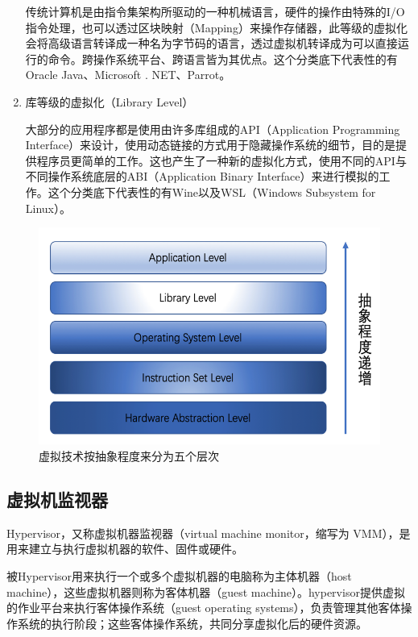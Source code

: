 \begin{enumerate}
    传统计算机是由指令集架构所驱动的一种机械语言，硬件的操作由特殊的I/O指令处理，也可以透过区块映射（Mapping）来操作存储器，此等级的虚拟化会将高级语言转译成一种名为字节码的语言，透过虚拟机转译成为可以直接运行的命令。跨操作系统平台、跨语言皆为其优点。这个分类底下代表性的有Oracle Java、Microsoft . NET、Parrot。
    \item 库等级的虚拟化（Library Level）

    大部分的应用程序都是使用由许多库组成的API（Application Programming Interface）来设计，使用动态链接的方式用于隐藏操作系统的细节，目的是提供程序员更简单的工作。这也产生了一种新的虚拟化方式，使用不同的API与不同操作系统底层的ABI（Application Binary Interface）来进行模拟的工作。这个分类底下代表性的有Wine以及WSL（Windows Subsystem for Linux）。
\end{enumerate}

\begin{figure}[htbp]
  \centering
  \includegraphics{./Figure/IMG_Chap2_1.png}
  \caption{虚拟技术按抽象程度来分为五个层次}\label{Fig:chap2_1}
\end{figure}

\subsection{虚拟机监视器}
Hypervisor，又称虚拟机器监视器（virtual machine monitor，缩写为 VMM），是用来建立与执行虚拟机器的软件、固件或硬件。

被Hypervisor用来执行一个或多个虚拟机器的电脑称为主体机器（host machine），这些虚拟机器则称为客体机器（guest machine）。hypervisor提供虚拟的作业平台来执行客体操作系统（guest operating systems），负责管理其他客体操作系统的执行阶段；这些客体操作系统，共同分享虚拟化后的硬件资源。

